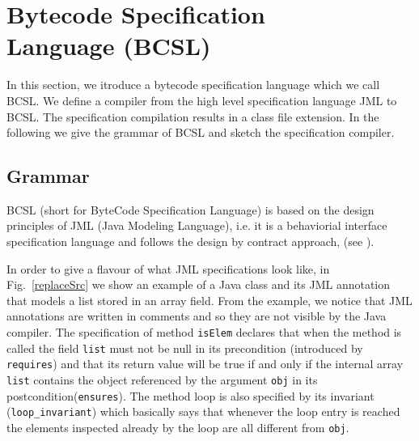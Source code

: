 
\section{Bytecode Specification \\Language (BCSL)}\label{bcSpecLg}
In this section, we itroduce a bytecode specification language which we call BCSL. We define a compiler from the high level specification language JML to BCSL. The specification compilation results in a class file extension. In the following we give the grammar of BCSL and sketch the specification compiler.



\subsection{Grammar} \label{grammar}
BCSL (short for ByteCode Specification Language) is based on the design principles of JML (Java Modeling Language), i.e. it is a behaviorial interface specification language and follows the design by contract approach, (see \cite{M97oos}).

In order to give a flavour of what JML specifications look like, in Fig.~\ref{replaceSrc} we show an example of a Java class and its 
JML annotation that models a list stored in an array field. 
From the example, we notice that JML annotations are written in comments and so they are not visible by the Java compiler.
The specification of method \verb!isElem! declares
 that when the method is called the field \verb!list! must not be null in its precondition (introduced by \verb!requires!) and that its return value will be true if and only if the internal array 
\verb!list! contains the object referenced by the argument \verb!obj! in its postcondition(\verb!ensures!). The method loop is also specified by
its invariant (\verb!loop_invariant!) which basically says that whenever the loop entry is reached the elements inspected already by the loop are all different from \verb!obj!.

